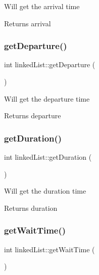 Will get the arrival time \begin{DoxyReturn}{Returns}
arrival 
\end{DoxyReturn}
\mbox{\label{classlinked_list_ab020f1ba62c4122bd272036f92456622}} 
\subsubsection{\texorpdfstring{get\+Departure()}{getDeparture()}}
{\footnotesize\ttfamily int linked\+List\+::get\+Departure (\begin{DoxyParamCaption}{ }\end{DoxyParamCaption})}

Will get the departure time \begin{DoxyReturn}{Returns}
departure 
\end{DoxyReturn}
\mbox{\label{classlinked_list_abeb787b0ae7ead2c483355f3a349de45}} 
\subsubsection{\texorpdfstring{get\+Duration()}{getDuration()}}
{\footnotesize\ttfamily int linked\+List\+::get\+Duration (\begin{DoxyParamCaption}{ }\end{DoxyParamCaption})}

Will get the duration time \begin{DoxyReturn}{Returns}
duration 
\end{DoxyReturn}
\mbox{\label{classlinked_list_a091107578b2804e7a03dbc7ce8c05348}} 
\subsubsection{\texorpdfstring{get\+Wait\+Time()}{getWaitTime()}}
{\footnotesize\ttfamily int linked\+List\+::get\+Wait\+Time (\begin{DoxyParamCaption}{ }\end{DoxyParamCaption})}

